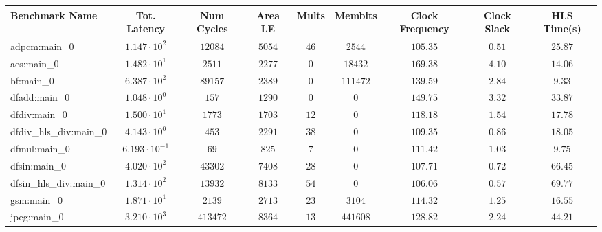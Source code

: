 \begin{tabular}{|l|c|c|c|c|c|c|c|c|}
\hline
Benchmark Name          & Tot. Latency            & Num Cycles & Area LE   & Mults   & Membits    & Clock Frequency & Clock Slack & HLS Time(s) \\
\hline
adpcm:main\_0           & $ 1.147 \cdot 10^{2}  $ & $ 12084  $ & $ 5054  $ & $ 46  $ & $ 2544   $ & $ 105.35      $ & $ 0.51    $ & $ 25.87   $ \\
aes:main\_0             & $ 1.482 \cdot 10^{1}  $ & $ 2511   $ & $ 2277  $ & $ 0   $ & $ 18432  $ & $ 169.38      $ & $ 4.10    $ & $ 14.06   $ \\
bf:main\_0              & $ 6.387 \cdot 10^{2}  $ & $ 89157  $ & $ 2389  $ & $ 0   $ & $ 111472 $ & $ 139.59      $ & $ 2.84    $ & $ 9.33    $ \\
dfadd:main\_0           & $ 1.048 \cdot 10^{0}  $ & $ 157    $ & $ 1290  $ & $ 0   $ & $ 0      $ & $ 149.75      $ & $ 3.32    $ & $ 33.87   $ \\
dfdiv:main\_0           & $ 1.500 \cdot 10^{1}  $ & $ 1773   $ & $ 1703  $ & $ 12  $ & $ 0      $ & $ 118.18      $ & $ 1.54    $ & $ 17.78   $ \\
dfdiv\_hls\_div:main\_0 & $ 4.143 \cdot 10^{0}  $ & $ 453    $ & $ 2291  $ & $ 38  $ & $ 0      $ & $ 109.35      $ & $ 0.86    $ & $ 18.05   $ \\
dfmul:main\_0           & $ 6.193 \cdot 10^{-1} $ & $ 69     $ & $ 825   $ & $ 7   $ & $ 0      $ & $ 111.42      $ & $ 1.03    $ & $ 9.75    $ \\
dfsin:main\_0           & $ 4.020 \cdot 10^{2}  $ & $ 43302  $ & $ 7408  $ & $ 28  $ & $ 0      $ & $ 107.71      $ & $ 0.72    $ & $ 66.45   $ \\
dfsin\_hls\_div:main\_0 & $ 1.314 \cdot 10^{2}  $ & $ 13932  $ & $ 8133  $ & $ 54  $ & $ 0      $ & $ 106.06      $ & $ 0.57    $ & $ 69.77   $ \\
gsm:main\_0             & $ 1.871 \cdot 10^{1}  $ & $ 2139   $ & $ 2713  $ & $ 23  $ & $ 3104   $ & $ 114.32      $ & $ 1.25    $ & $ 16.55   $ \\
jpeg:main\_0            & $ 3.210 \cdot 10^{3}  $ & $ 413472 $ & $ 8364  $ & $ 13  $ & $ 441608 $ & $ 128.82      $ & $ 2.24    $ & $ 44.21   $ \\

\end{tabular}
